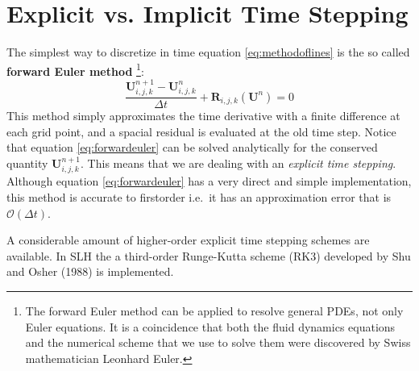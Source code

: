 \section{Explicit vs. Implicit Time Stepping}
The simplest way to discretize in time equation \ref{eq:methodoflines} is the so called \textbf{forward Euler method} \footnote{The forward Euler method can be applied to resolve general PDEs, not only Euler equations. It is a coincidence that both the fluid dynamics equations and the numerical scheme that we use to solve them were discovered by Swiss mathematician Leonhard Euler.}:
\begin{equation}\label{eq:forwardeuler}
	\frac{\mathbf{U}^{n+1}_{i, j, k} - \mathbf{U}^{n}_{i, j, k}}{\Delta t} + \mathbf{R}_{i, j, k}(\mathbf{U}^n)=0
\end{equation}
This method simply approximates the time derivative with a finite difference at each grid point, and a spacial residual is evaluated at the old time step. Notice that equation \ref{eq:forwardeuler} can be solved analytically for the conserved quantity $\mathbf{U}^{n+1}_{i, j, k}$. This means that we are dealing with an \textit{explicit time stepping}. Although equation \ref{eq:forwardeuler} has a very direct and simple implementation, this method is accurate to firstorder i.e.\ it has an approximation error that is $\mathcal{O}(\Delta t)$.

A considerable amount of higher-order explicit time stepping schemes are available. In SLH the a third-order Runge-Kutta scheme (RK3) developed by Shu and Osher (1988) is implemented. 


